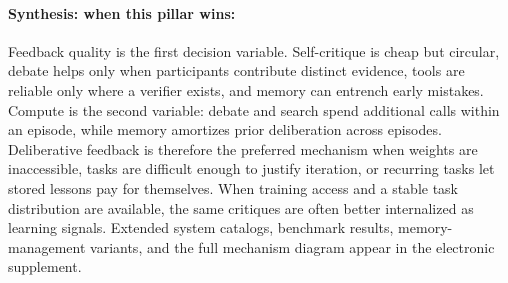 \paragraph{Synthesis: when this pillar wins:}
Feedback quality is the first decision variable. Self-critique is cheap but circular, debate helps only when participants contribute distinct evidence, tools are reliable only where a verifier exists, and memory can entrench early mistakes. Compute is the second variable: debate and search spend additional calls within an episode, while memory amortizes prior deliberation across episodes. Deliberative feedback is therefore the preferred mechanism when weights are inaccessible, tasks are difficult enough to justify iteration, or recurring tasks let stored lessons pay for themselves. When training access and a stable task distribution are available, the same critiques are often better internalized as learning signals. Extended system catalogs, benchmark results, memory-management variants, and the full mechanism diagram appear in the electronic supplement.
